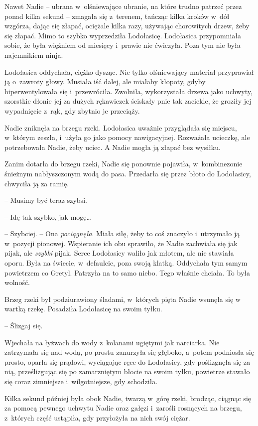 \documentclass[oneside,polish,11pt,sfheadings]{mwbk}
\begin{document}
Nawet Nadie -- ubrana w~olśniewające ubranie, na które trudno patrzeć
przez ponad kilka sekund -- zmagała się z~terenem, tańcząc kilka kroków w~dół wzgórza, dając się złapać, ociężale kilka razy, używając chorowitych
drzew, żeby się złapać. Mimo to szybko wyprzedziła Lodołasicę.
Lodołasica przypomniała sobie, że była więźniem od miesięcy i~prawie nie
ćwiczyła. Poza tym nie była najemnikiem ninja.

Lodołasica oddychała, ciężko dysząc. Nie tylko olśniewający materiał
przyprawiał ją o~zawroty głowy. Musiała iść dalej, ale miałaby kłopoty,
gdyby hiperwentylowała się i~przewróciła. Zwolniła, wykorzystała drzewa
jako uchwyty, szorstkie dłonie jej za dużych rękawiczek ściskały pnie
tak zaciekle, że groziły jej wypadnięcie z~rąk, gdy zbytnio je
przeciąży.

Nadie zniknęła na brzegu rzeki. Lodołasica uważnie przyglądała się
miejscu, w~którym zeszła, i~użyła go jako pomocy nawigacyjnej. Rozważała
ucieczkę, ale potrzebowała Nadie, żeby uciec. A Nadie mogła ją złapać
bez wysiłku.

Zanim dotarła do brzegu rzeki, Nadie się ponownie pojawiła, w~kombinezonie śnieżnym nabłyszczonym wodą do pasa. Przedarła się przez
błoto do Lodołasicy, chwyciła ją za ramię.

-- Musimy być teraz szybsi.

-- Idę tak szybko, jak mogę\ldots 

-- Szybciej. -- Ona \textit{pociągnęła}. Miała siłę, żeby to coś znaczyło i~utrzymało ją w~pozycji pionowej. Wspieranie ich obu sprawiło, że Nadie
zachwiała się jak pijak, ale \textit{szybki} pijak. Serce Lodołasicy
waliło jak młotem, ale nie stawiała oporu. Była na świecie, w~defaulcie,
poza swoją klatką. Oddychała tym samym powietrzem co Gretyl. Patrzyła na
to samo niebo. Tego właśnie chciała. To była wolność.

Brzeg rzeki był podziurawiony śladami, w~których pięta Nadie wsunęła się
w wartką rzekę. Posadziła Lodołasicę na swoim tyłku. 

-- Ślizgaj się. 

Wjechała na łyżwach do wody z~kolanami ugiętymi jak narciarka. Nie
zatrzymała się nad wodą, po prostu zanurzyła się głęboko, a~potem
podniosła się prosto, oparła się prądowi, wyciągając ręce do Lodołasicy,
gdy poślizgnęła się za nią, prześlizgując się po zamarzniętym błocie na
swoim tyłku, powietrze stawało się coraz zimniejsze i~wilgotniejsze, gdy
schodziła.

Kilka sekund później była obok Nadie, twarzą w~górę rzeki, brodząc,
ciągnąc się za pomocą pewnego uchwytu Nadie oraz gałęzi i~zarośli
rosnących na brzegu, z~których część ustąpiła, gdy przyłożyła na nich
swój ciężar.
\end{document}
